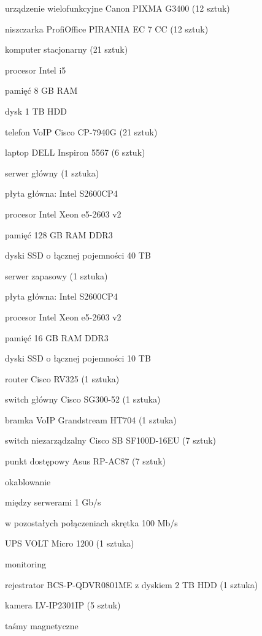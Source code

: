 \begin{minipage}[\right]{15cm}
\begin{itemize*}
	\item urządzenie wielofunkcyjne Canon PIXMA G3400 (12 sztuk)
	\item niszczarka ProfiOffice PIRANHA EC 7 CC (12 sztuk)
	\item komputer stacjonarny (21 sztuk)
	\begin{itemize*}
		\item procesor Intel i5
		\item pamięć 8 GB RAM 
		\item dysk 1 TB HDD 
	\end{itemize*}
	\item telefon VoIP Cisco CP-7940G (21 sztuk)
	\item laptop DELL Inspiron 5567 (6 sztuk)
	\item serwer główny (1 sztuka)
	\begin{itemize*}
		\item płyta główna: Intel S2600CP4
		\item procesor Intel Xeon e5-2603 v2
		\item pamięć 128 GB RAM DDR3
		\item dyski SSD o łącznej pojemności 40 TB 
	\end{itemize*}
	\item serwer zapasowy (1 sztuka)
	\begin{itemize*}
		\item płyta główna: Intel S2600CP4
		\item procesor Intel Xeon e5-2603 v2
		\item pamięć 16 GB RAM DDR3
		\item dyski SSD o łącznej pojemności 10 TB 
	\end{itemize*}
	\item router Cisco RV325 (1 sztuka)
	\item switch główny Cisco SG300-52 (1 sztuka)
	\item bramka VoIP Grandstream HT704 (1 sztuka)
	\item switch niezarządzalny Cisco SB SF100D-16EU (7 sztuk)
	\item punkt dostępowy Asus RP-AC87 (7 sztuk)
	\item okablowanie 
	\begin{itemize*}
		\item między serwerami 1 Gb/s
		\item w pozostałych połączeniach skrętka 100 Mb/s
	\end{itemize*}
	\item UPS VOLT Micro 1200 (1 sztuka)
	\item monitoring
	\begin{itemize*}
		\item rejestrator BCS-P-QDVR0801ME z dyskiem 2 TB HDD (1 sztuka)
		\item kamera LV-IP2301IP (5 sztuk)
	\end{itemize*}
	\item taśmy magnetyczne
\end{itemize*}
\end{minipage}
